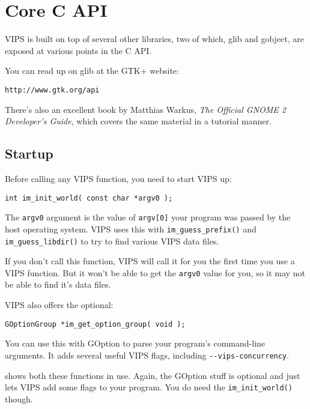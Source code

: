 \section{Core C API}

VIPS is
built on top of several other libraries, two of which, glib and gobject, are 
exposed at various points in the C API.

You can read up on glib at the GTK+ website:

\begin{verbatim}
http://www.gtk.org/api
\end{verbatim}

There's also an excellent book by Matthias Warkus, \emph{The Official 
GNOME 2 Developer's Guide}, which covers the same material in a tutorial
manner.

\subsection{Startup}

Before calling any VIPS function, you need to start VIPS up:

\begin{verbatim}
int im_init_world( const char *argv0 );
\end{verbatim}

The \verb+argv0+ argument is the value of \verb+argv[0]+ your
program was passed by the host operating system. VIPS uses this with
\verb+im_guess_prefix()+ and \verb+im_guess_libdir()+ to try to find various 
VIPS data files.

If you don't call this function, VIPS will call it for you the first time you
use a VIPS function. But it won't be able to get the \verb+argv0+ value for
you, so it may not be able to find it's data files.

VIPS also offers the optional:

\begin{verbatim}
GOptionGroup *im_get_option_group( void );
\end{verbatim}

You can use this with GOption to parse your program's command-line arguments.
It adds several useful VIPS flags, including \verb+--vips-concurrency+.

 shows both these functions in use. Again, the GOption stuff is
optional and just lets VIPS add some flags to your program. You do need the
\verb+im_init_world()+ though.

